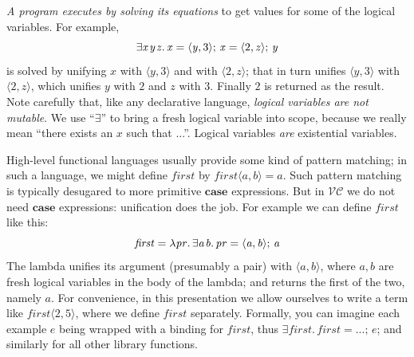 \documentclass[acmsmall,review,dvipsnames]{acmart}
\newcommand{\Varid}[1]{\mathit{#1}}
\newcommand{\versecalc}{$\mathcal{VC}$}
\begin{document}
\emph{A program executes by solving its equations} to get values for some of the logical variables.
For example,
$$
\ensuremath{\exists\Varid{x}\hspace{0.3mm}\Varid{y}\hspace{0.3mm}\Varid{z}.\,\Varid{x}\mathrel{=}\langle{}\Varid{y},\mathrm{3}\rangle;\,\Varid{x}\mathrel{=}\langle{}\mathrm{2},\Varid{z}\rangle;\,\Varid{y}}
$$
is solved by unifying \ensuremath{\Varid{x}} with \ensuremath{\langle{}\Varid{y},\mathrm{3}\rangle} and with \ensuremath{\langle{}\mathrm{2},\Varid{z}\rangle}; that in turn unifies \ensuremath{\langle{}\Varid{y},\mathrm{3}\rangle} with \ensuremath{\langle{}\mathrm{2},\Varid{z}\rangle}, which
unifies \ensuremath{\Varid{y}} with \ensuremath{\mathrm{2}} and \ensuremath{\Varid{z}} with \ensuremath{\mathrm{3}}.  Finally \ensuremath{\mathrm{2}} is returned as the result.
Note carefully that, like any declarative language,
\emph{logical variables are not mutable}.
We use ``\ensuremath{\exists}'' to bring a fresh logical variable into scope, because we really
mean ``there exists an \ensuremath{\Varid{x}} such that ...''.  Logical variables \emph{are} existential variables.

High-level functional languages usually provide some kind of
pattern matching; in such a language, we might define \ensuremath{\Varid{first}} by
\ensuremath{\Varid{first}\langle\Varid{a},\Varid{b}\rangle\mathrel{=}\Varid{a}}. Such pattern matching is typically desugared to
more primitive \ensuremath{\textbf{case}} expressions.  But in \versecalc{} we do not need \ensuremath{\textbf{case}} expressions:
unification does the job.  For example we can define \ensuremath{\Varid{first}} like this:
$$
\ensuremath{\Varid{first}\mathrel{=}\lambda\Varid{pr}.\,\exists\Varid{a}\hspace{0.3mm}\Varid{b}.\,\Varid{pr}\mathrel{=}\langle{}\Varid{a},\Varid{b}\rangle;\,\Varid{a}}
$$
The lambda unifies its argument (presumably a pair)
with \ensuremath{\langle{}\Varid{a},\Varid{b}\rangle}, where \ensuremath{\Varid{a},\Varid{b}} are fresh logical
variables in the body of the lambda; and returns the first of the two, namely \ensuremath{\Varid{a}}.
For convenience, in this presentation we allow ourselves to write a term like
\ensuremath{\Varid{first}\langle\mathrm{2},\mathrm{5}\rangle}, where we define \ensuremath{\Varid{first}} separately. Formally, you can imagine
each example \ensuremath{\Varid{e}} being wrapped with a binding for \ensuremath{\Varid{first}}, thus \ensuremath{\exists\Varid{first}.\,\Varid{first}\mathrel{=}\mathbin{...};\,\Varid{e}};
and similarly for all other library functions.
\end{document}
